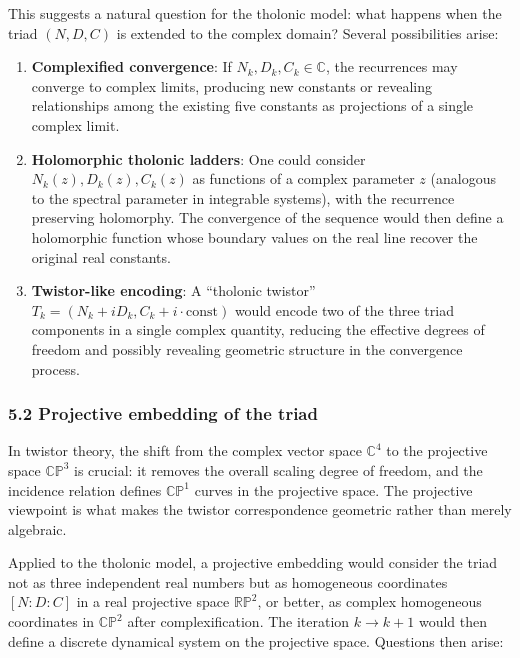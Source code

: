 \documentclass[
  11pt,
  letterpaper,
]{article}
\begin{document}
This suggests a natural question for the tholonic model: what happens
when the triad \((N, D, C)\) is extended to the complex domain? Several
possibilities arise:

\begin{enumerate}
\def\labelenumi{\arabic{enumi}.}
\item
  \textbf{Complexified convergence}: If
  \(N_k, D_k, C_k \in \mathbb{C}\), the recurrences may converge to
  complex limits, producing new constants or revealing relationships
  among the existing five constants as projections of a single complex
  limit.
\item
  \textbf{Holomorphic tholonic ladders}: One could consider
  \(N_k(z), D_k(z), C_k(z)\) as functions of a complex parameter \(z\)
  (analogous to the spectral parameter in integrable systems), with the
  recurrence preserving holomorphy. The convergence of the sequence
  would then define a holomorphic function whose boundary values on the
  real line recover the original real constants.
\item
  \textbf{Twistor-like encoding}: A ``tholonic twistor''
  \(T_k = (N_k + i D_k, C_k + i \cdot \text{const})\) would encode two
  of the three triad components in a single complex quantity, reducing
  the effective degrees of freedom and possibly revealing geometric
  structure in the convergence process.
\end{enumerate}

\subsubsection{5.2 Projective embedding of the
triad}\label{projective-embedding-of-the-triad}

In twistor theory, the shift from the complex vector space
\(\mathbb{C}^4\) to the projective space \(\mathbb{CP}^3\) is crucial:
it removes the overall scaling degree of freedom, and the incidence
relation defines \(\mathbb{CP}^1\) curves in the projective space. The
projective viewpoint is what makes the twistor correspondence geometric
rather than merely algebraic.

Applied to the tholonic model, a projective embedding would consider the
triad not as three independent real numbers but as homogeneous
coordinates \([N : D : C]\) in a real projective space
\(\mathbb{RP}^2\), or better, as complex homogeneous coordinates in
\(\mathbb{CP}^2\) after complexification. The iteration \(k \to k+1\)
would then define a discrete dynamical system on the projective space.
Questions then arise:
\end{document}
